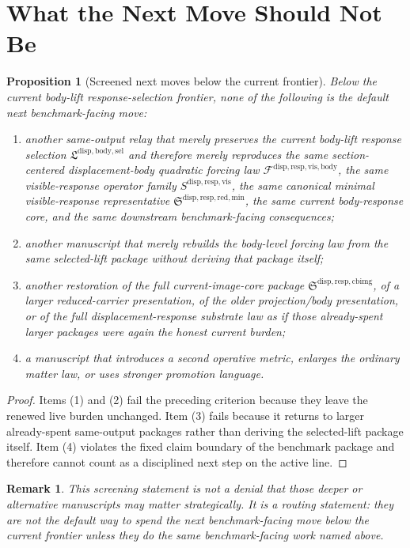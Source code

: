\documentclass[11pt]{article}
\newcommand{\LiftSelectionPackage}{\mathfrak L^{\mathrm{disp,body,sel}}}
\newcommand{\VisibleBodyForcingLaw}{\mathscr F^{\mathrm{disp,resp,vis,body}}}
\newcommand{\VisibleResponseOperator}{S^{\mathrm{disp,resp,vis}}}
\newcommand{\MinimalReducedStructure}{\mathfrak S^{\mathrm{disp,resp,red,min}}}
\newcommand{\CurrentBodyImageCore}{\mathfrak S^{\mathrm{disp,resp,cbimg}}}
\newtheorem{proposition}{Proposition}
\newtheorem{remark}{Remark}
\begin{document}
\section{What the Next Move Should Not Be}

\begin{proposition}[Screened next moves below the current frontier]
Below the current body-lift response-selection frontier, none of the following is the default next benchmark-facing move:
\begin{enumerate}
    \item another same-output relay that merely preserves the current body-lift response selection \(\LiftSelectionPackage\) and therefore merely reproduces the same section-centered displacement-body quadratic forcing law \(\VisibleBodyForcingLaw\), the same visible-response operator family \(\VisibleResponseOperator\), the same canonical minimal visible-response representative \(\MinimalReducedStructure\), the same current body-response core, and the same downstream benchmark-facing consequences;
    \item another manuscript that merely rebuilds the body-level forcing law from the same selected-lift package without deriving that package itself;
    \item another restoration of the full current-image-core package \(\CurrentBodyImageCore\), of a larger reduced-carrier presentation, of the older projection/body presentation, or of the full displacement-response substrate law as if those already-spent larger packages were again the honest current burden;
    \item a manuscript that introduces a second operative metric, enlarges the ordinary matter law, or uses stronger promotion language.
\end{enumerate}
\end{proposition}

\begin{proof}
Items (1) and (2) fail the preceding criterion because they leave the renewed live burden unchanged. Item (3) fails because it returns to larger already-spent same-output packages rather than deriving the selected-lift package itself. Item (4) violates the fixed claim boundary of the benchmark package and therefore cannot count as a disciplined next step on the active line.
\end{proof}

\begin{remark}
This screening statement is not a denial that those deeper or alternative manuscripts may matter strategically. It is a routing statement: they are not the default way to spend the next benchmark-facing move below the current frontier unless they do the same benchmark-facing work named above.
\end{remark}
\end{document}
